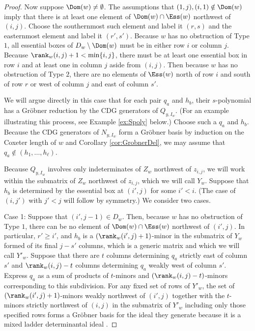\begin{proof}
Now suppose $\Dom(w) \neq \emptyset$.  The assumptions that $(1,j), (i,1) \notin \Dom(w)$ imply that there is at least one element of $\Dom(w) \cap \Ess(w)$ northwest of $(i,j)$.  Choose the southernmost such element and label it $(r,s)$ and the easternmost element and label it $(r',s')$.  Because $w$ has no obstruction of Type $1$, all essential boxes of $D_w \setminus \Dom(w)$ must be in either row $i$ or column $j$.  Because $\rank_w(i,j)+1 < \min\{i,j\}$, there must be at least one essential box in row $i$ and at least one in column $j$ aside from $(i,j)$. Then because $w$ has no obstruction of Type $2$, there are no elements of $\Ess(w)$ north of row $i$ and south of row $r$ or west of column $j$ and east of column $s'$.  

We will argue directly in this case that for each pair $q_a$ and $h_b$, their $s$-polynomial has a Gr\"obner reduction by the CDG generators of $Q_{y,I_w}$.  (For an example illustrating this process, see Example \ref{ex:Spoly} below.)  Choose such a $q_a$ and $h_b$.  Because the CDG generators of $N_{y,I_w}$ form a Gr\"obner basis by induction on the Coxeter length of $w$ and Corollary \ref{cor:GrobnerDel}, we may assume that $q_a \notin (h_1, \ldots, h_\ell)$.  

Because $Q_{y,I_w}$ involves only indeterminates of $Z_w$ northwest of $z_{i,j}$, we will work within the submatrix of $Z_w$ northwest of $z_{i,j}$, which we will call $Y_w$.  Suppose that $h_b$ is determined by the essential box at $(i',j)$ for some $i'<i$.  (The case of $(i,j')$ with $j'<j$ will follow by symmetry.)  We consider two cases.  

Case 1: Suppose that $(i',j-1) \in D_w$.  Then, because $w$ has no obstruction of Type $1$, there can be no element of $\Dom(w) \cap \Ess(w)$ northwest of $(i',j)$.  In particular, $r' \geq i'$, and $h_b$ is a $(\rank_w(i',j)+1)$-minor in the submatrix of $Y_w$ formed of its final $j-s'$ columns, which is a generic matrix and which we will call $Y'_w$.  Suppose that there are $t$ columns determining $q_a$ strictly east of column $s'$ and $\rank_w(i,j)-t$ columns determining $q_a$ weakly west of column $s'$.  Express $q_a$ as a sum of products of $t$-minors and $(\rank_w(i,j)-t)$-minors corresponding to this subdivision.  For any fixed set of rows of $Y'_w$, the set of $(\rank_w(i',j)+1)$-minors weakly northwest of $(i',j)$ together with the $t$-minors strictly northwest of $(i,j)$ in the submatrix of $Y'_w$ including only those specified rows forms a Gr\"obner basis for the ideal they generate because it is a mixed ladder determinantal ideal \cite[Theorem 1.10]{Gor07}.  


\end{proof}
